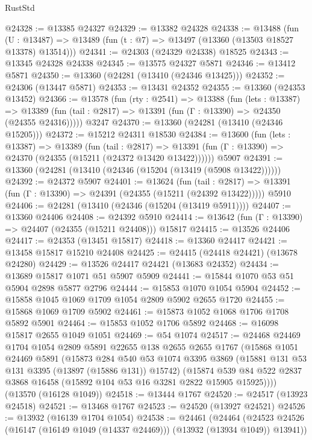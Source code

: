 \begin{lexlean}{RustStd}
\begin{coremodule}
@24328 := @13385 @24327
@24329 := @13382 @24328
@24338 := @13488
    (fun (U : @13487) => @13489 (fun (t : @7) => @13497 (@13360 (@13503 @18527 @13378) @13514)))
@24341 := @24303 (@24329 @24338) @18525
@24343 := @13345 @24328 @24338
@24345 := @13575 @24327 @5871
@24346 := @13412 @5871
@24350 := @13360 (@24281 (@13410 (@24346 @13425)))
@24352 := @24306 (@13447 @5871)
@24353 := @13431 @24352
@24355 := @13360 (@24353 @13452)
@24366 := @13578
    (fun (rty : @2541) =>
    @13388
      (fun (lets : @13387) =>
      @13389 (fun (tail : @2817) => @13391 (fun (Γ : @13390) => @24350 (@24355 @24316)))))
    @3247
@24370 := @13360 (@24281 (@13410 (@24346 @15205)))
@24372 := @15212 @24311 @18530
@24384 := @13600
    (fun (lets : @13387) =>
    @13389
      (fun (tail : @2817) =>
      @13391 (fun (Γ : @13390) => @24370 (@24355 (@15211 (@24372 @13420 @13422))))))
    @5907
@24391 := @13360 (@24281 (@13410 (@24346 (@15204 (@13419 (@5908 @13422))))))
@24392 := @24372 @5907
@24401 := @13624
    (fun (tail : @2817) => @13391 (fun (Γ : @13390) => @24391 (@24355 (@15211 (@24392 @13422)))))
    @5910
@24406 := @24281 (@13410 (@24346 (@15204 (@13419 @5911))))
@24407 := @13360 @24406
@24408 := @24392 @5910
@24414 := @13642 (fun (Γ : @13390) => @24407 (@24355 (@15211 @24408))) @15817
@24415 := @13526 @24406
@24417 := @24353 (@13451 @15817)
@24418 := @13360 @24417
@24421 := @13458 @15817 @15210 @24408
@24425 := @24415 (@24418 @24421) (@13678 @24280)
@24429 := @13526 @24417 @24421 (@13683 @24352)
@24434 := @13689 @15817 @1071 @51 @5907 @5909
@24441 := @15844 @1070 @53 @51 @5904 @2898 @5877 @2796
@24444 := @15853 @1070 @1054 @5904
@24452 := @15858 @1045 @1069 @1709 @1054 @2809 @5902 @2655 @1720
@24455 := @15868 @1069 @1709 @5902
@24461 := @15873 @1052 @1068 @1706 @1708 @5892 @5901
@24464 := @15853 @1052 @1706 @5892
@24468 := @16098 @15817 @2655 @1049 @1051
@24469 := @54 @1074
@24517 := @24468
    @24469
    @1704
    @1054
    @2809
    @5891
    @22655
    @138
    @2655
    @2655
    @1767
    (@15868
      @1051
      @24469
      @5891
      (@15873
        @284
        @540
        @53
        @1074
        @3395
        @3869
        (@15881 @131 @53 @131 @3395 (@13897 (@15886 @131)) @15742)
        (@15874 @539 @84 @522 @2837 @3868 @16458 (@15892 @104 @53 @16 @3281 @2822 @15905 @15925))))
    (@13570 (@16128 @1049))
@24518 := @13444 @1767
@24520 := @24517 (@13923 @24518)
@24521 := @13468 @1767
@24523 := @24520 (@13927 @24521)
@24526 := @13932 (@16139 @1704 @1054)
@24538 := @24461
    (@24464 (@24523 @24526 (@16147 (@16149 @1049 (@14337 @24469))) (@13932 (@13934 @1049)) @13941))

\end{coremodule}
\end{lexlean}
